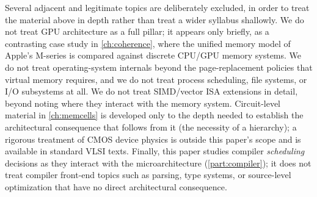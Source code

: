 \documentclass[12pt,a4paper]{report}
\begin{document}
Several adjacent and legitimate topics are deliberately excluded, in
order to treat the material above in depth rather than treat a wider
syllabus shallowly. We do not treat GPU architecture as a full pillar;
it appears only briefly, as a contrasting case study in
\cref{ch:coherence}, where the unified memory model of Apple's M-series
is compared against discrete CPU/GPU memory systems. We do not treat
operating-system internals beyond the page-replacement policies that
virtual memory requires, and we do not treat process scheduling,
file systems, or I/O subsystems at all. We do not treat SIMD/vector
ISA extensions in detail, beyond noting where they interact with the
memory system. Circuit-level material in \cref{ch:memcells} is developed
only to the depth needed to establish the architectural consequence that
follows from it (the necessity of a hierarchy); a rigorous treatment of
CMOS device physics is outside this paper's scope and is available in
standard VLSI texts. Finally, this paper studies compiler
\emph{scheduling} decisions as they interact with the microarchitecture
(\cref{part:compiler}); it does not treat compiler front-end topics such
as parsing, type systems, or source-level optimization that have no
direct architectural consequence.
\end{document}
